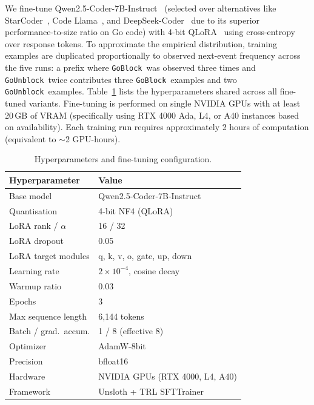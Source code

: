 \documentclass[10pt,conference]{IEEEtran}
\newcommand{\eblock}{\texttt{GoBlock}}
\newcommand{\eunblock}{\texttt{GoUnblock}}
\begin{document}
We fine-tune Qwen2.5-Coder-7B-Instruct~\cite{qwen} (selected over alternatives like StarCoder~\cite{li2023starcoder}, Code Llama~\cite{roziere2023codellama}, and DeepSeek-Coder~\cite{guo2024deepseekcoder} due to its superior performance-to-size ratio on Go code) with 4-bit
QLoRA~\cite{qlora,lora} using cross-entropy over response tokens.
To approximate the empirical distribution, training examples are
duplicated proportionally to observed next-event frequency across the
five runs: a prefix where \eblock\ was observed three times and
\eunblock\ twice contributes three \eblock\ examples and two
\eunblock\ examples.
Table~\ref{tab:hparams} lists the hyperparameters shared across all fine-tuned variants. Fine-tuning is performed on single NVIDIA GPUs with at least 20\,GB of VRAM (specifically using RTX 4000 Ada, L4, or A40 instances based on availability). Each training run requires approximately 2 hours of computation (equivalent to $\sim$2 GPU-hours).

\begin{table}[t]
\centering
\caption{Hyperparameters and fine-tuning configuration.}
\label{tab:hparams}
\vspace*{8pt}
\small
\begin{tabular}{@{}ll@{}}
\toprule
\textbf{Hyperparameter} & \textbf{Value}\\
\midrule
Base model               & Qwen2.5-Coder-7B-Instruct\\
Quantisation             & 4-bit NF4 (QLoRA)\\
LoRA rank / $\alpha$     & 16 / 32\\
LoRA dropout             & 0.05\\
LoRA target modules      & q, k, v, o, gate, up, down\\
Learning rate            & $2\times10^{-4}$, cosine decay\\
Warmup ratio             & 0.03\\
Epochs                   & 3\\
Max sequence length      & 6{,}144 tokens\\
Batch / grad.\ accum.    & 1 / 8 (effective 8)\\
Optimizer                & AdamW-8bit\\
Precision                & bfloat16\\
Hardware                 & NVIDIA GPUs (RTX 4000, L4, A40)\\
Framework                & Unsloth + TRL SFTTrainer\\
\bottomrule
\end{tabular}
\end{table}
\end{document}
